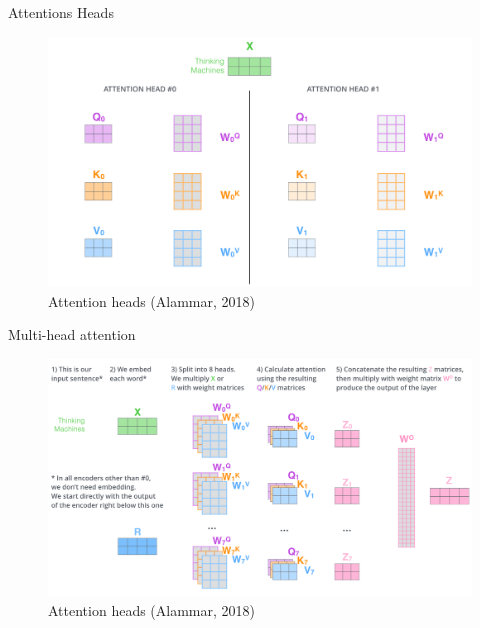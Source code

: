 \documentclass[10pt]{beamer}
\begin{document}
\begin{frame}{Attentions Heads}

\begin{figure}[h]
\centering
\includegraphics[width=1\textwidth]{fig/alammar_transformer_attention_heads_qkv.png}
\caption{Attention heads (Alammar, 2018)}
\end{figure}

\end{frame}


\begin{frame}{Multi-head attention}

\begin{figure}[h]
\centering
\includegraphics[width=1\textwidth]{fig/alammar_transformer_multi-headed_self-attention-recap.png}
\caption{Attention heads (Alammar, 2018)}
\end{figure}

\end{frame}
\end{document}
